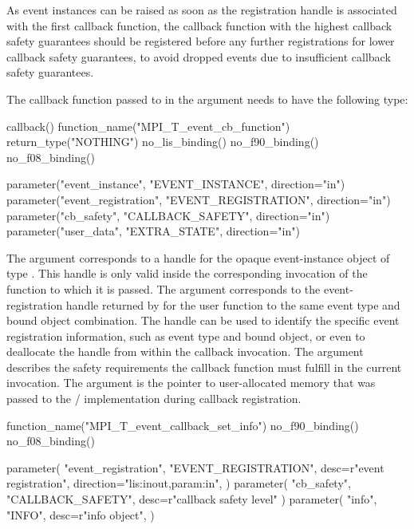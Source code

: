 \begin{users}
    As event instances can be raised as soon as the registration handle is
    associated with the first callback function, the callback function with
    the highest callback safety guarantees should be registered before any
    further registrations for lower callback safety guarantees, to avoid
    dropped events due to insufficient callback safety guarantees.
\end{users}

The callback function passed to 
in the argument  needs to have the following
type:

\begin{mpi-binding}
    callback()
    function_name("MPI_T_event_cb_function")
    return_type("NOTHING")
    no_lis_binding()
    no_f90_binding()
    no_f08_binding()

    parameter("event_instance", "EVENT_INSTANCE", direction="in")
    parameter("event_registration", "EVENT_REGISTRATION", direction="in")
    parameter("cb_safety", "CALLBACK_SAFETY", direction="in")
    parameter("user_data", "EXTRA_STATE", direction="in")
\end{mpi-binding}

The argument  corresponds to a handle for the
opaque event-instance object of type 
. 
This handle is only valid inside the
corresponding invocation of the function to which it is passed.  The
argument  corresponds to the event-registration handle
returned by  for the user function to
the same event type and bound object combination.  The handle can be used
to identify the specific event registration information, such as event type
and bound object, or even to deallocate the handle from within the callback
invocation.
The argument  describes the safety requirements the
callback function must fulfill in the current invocation.  The argument
 is the pointer to user-allocated memory that was
passed to the \MPI/ implementation during callback registration.

\begin{mpi-binding}
    function_name("MPI_T_event_callback_set_info")
    no_f90_binding()
    no_f08_binding()

    parameter(
        "event_registration",
        "EVENT_REGISTRATION",
        desc=r"event registration",
        direction="lis:inout,param:in",
    )
    parameter(
        "cb_safety",
        "CALLBACK_SAFETY",
        desc=r"callback safety level"
    )
    parameter(
        "info",
        "INFO",
        desc=r"info object",
    )
\end{mpi-binding}

